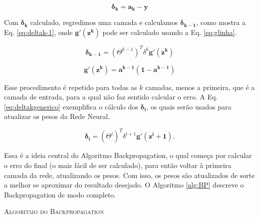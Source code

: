 \begin{equation}
\label{eq:deltak}
\mathbf{\delta_k} = \mathbf{a_k} - \mathbf{y}
\end{equation}

Com $\mathbf{\delta_k}$ calculado, regredimos uma camada e calculamos $\mathbf{\delta_{k-1}}$, como mostra a Eq. \eqref{eq:deltak-1}, onde $\mathbf{g'(z^k)}$ pode ser calculado usando a Eq. \eqref{eq:glinha}.

\begin{equation}
\label{eq:deltak-1}
\mathbf{\delta_{k-1}} = (\Theta^{k-1})^T \delta^{k}  \mathbf{g'(z^k)}
\end{equation}
  
\begin{equation}
\label{eq:glinha}
\mathbf{g'(z^k)} = \mathbf{a^{k-1}(1-a^{k-1})}
\end{equation}

Esse procedimento é repetido para todas as $k$ camadas, menos a primeira, que é a camada de entrada, para a qual não faz sentido calcular o erro. A Eq. \ref{eq:deltakgenerico} exemplifica o cálculo dos $\mathbf{\delta_{i}}$, os quais serão usados para atualizar os pesos da Rede Neural.  

\begin{equation}
\label{eq:deltakgenerico}
\mathbf{\delta_{i}} = (\Theta^{i})^T \delta^{i+1}  \mathbf{g'(z^i+1)}.
\end{equation}
 
 Essa é a ideia central do Algoritmo Backpropagation, o qual começa por calcular o erro do final (o mais fácil de ser calculado), para então voltar à primeira camada da rede, atualizando os pesos. Com isso, os pesos são atualizados de sorte a melhor se aproximar do resultado desejado. O Algoritmo \ref{alg:BP} descreve o  Backpropagation de modo completo.
 
 \begin{algorithm}[H]
   \SetAlgoLined
   \Saida{$\Theta$}
   \Retorna{$\Theta$}
   \label{alg:BP}
   \caption{\textsc{Algoritmo do Backpropagation }}
 \end{algorithm}

